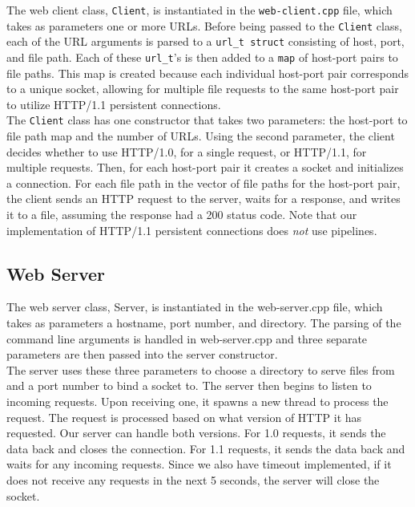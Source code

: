 \documentclass{article}
\begin{document}
The web client class, \texttt{Client}, is instantiated in the \texttt{web-client.cpp} file, which takes as parameters one or more URLs. Before being passed to the \texttt{Client} class, each of the URL arguments is parsed to a \texttt{url\_t struct} consisting of host, port, and file path. Each of these \texttt{url\_t}'s is then added to a \texttt{map} of host-port pairs to file paths. This map is created because each individual host-port pair corresponds to a unique socket, allowing for multiple file requests to the same host-port pair to utilize HTTP/1.1 persistent connections. \\

\noindent
The \texttt{Client} class has one constructor that takes two parameters: the host-port to file path map and the number of URLs. Using the second parameter, the client decides whether to use HTTP/1.0, for a single request, or HTTP/1.1, for multiple requests. Then, for each host-port pair it creates a socket and initializes a connection. For each file path in the vector of file paths for the host-port pair, the client sends an HTTP request to the server, waits for a response, and writes it to a file, assuming the response had a 200 status code. Note that our implementation of HTTP/1.1 persistent connections does \textit{not} use pipelines.

\subsection{Web Server}

The web server class, Server, is instantiated in the web-server.cpp file, which takes as parameters a hostname, port number, and directory. The parsing of the command line arguments is handled in web-server.cpp and three separate parameters are then passed into the server constructor. \\

\noindent
The server uses these three parameters to choose a directory to serve files from and a port number to bind a socket to. The server then begins to listen to incoming requests. Upon receiving one, it spawns a new thread to process the request. The request is processed based on what version of HTTP it has requested. Our server can handle both versions. For 1.0 requests, it sends the data back and closes the connection. For 1.1 requests, it sends the data back and waits for any incoming requests. Since we also have timeout implemented, if it does not receive any requests in the next 5 seconds, the server will close the socket.
\end{document}
